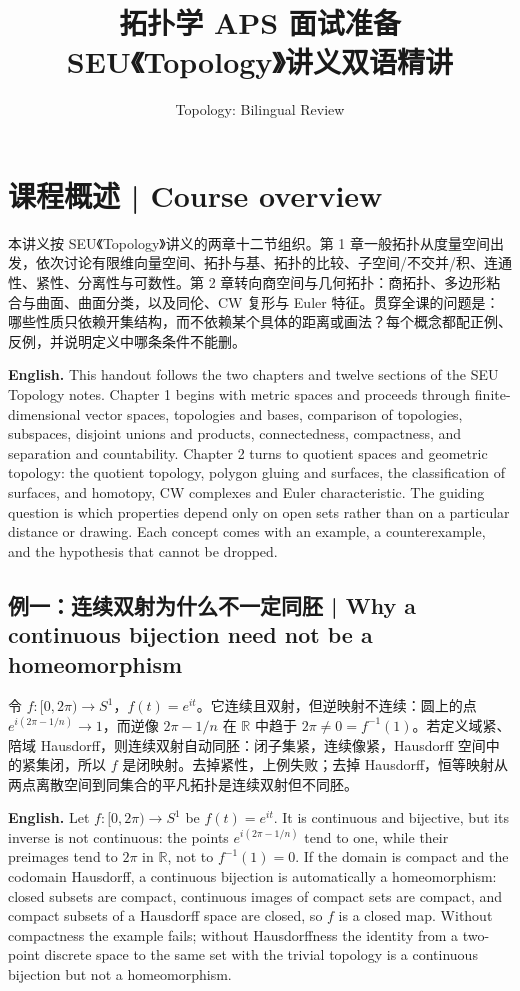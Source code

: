 \documentclass[UTF8,11pt,a4paper]{ctexart}
\title{拓扑学 APS 面试准备\\[4pt]\large SEU《Topology》讲义双语精讲}
\author{Topology: Bilingual Review}
\date{}
\newcommand{\EN}[1]{\par\noindent\textbf{English.} #1\par}
\begin{document}
\maketitle

\section*{课程概述 | Course overview}
\noindent 本讲义按 SEU《Topology》讲义的两章十二节组织。第 1 章一般拓扑从度量空间出发，依次讨论有限维向量空间、拓扑与基、拓扑的比较、子空间/不交并/积、连通性、紧性、分离性与可数性。第 2 章转向商空间与几何拓扑：商拓扑、多边形粘合与曲面、曲面分类，以及同伦、CW 复形与 Euler 特征。贯穿全课的问题是：哪些性质只依赖开集结构，而不依赖某个具体的距离或画法？每个概念都配正例、反例，并说明定义中哪条条件不能删。
\EN{This handout follows the two chapters and twelve sections of the SEU Topology notes. Chapter 1 begins with metric spaces and proceeds through finite-dimensional vector spaces, topologies and bases, comparison of topologies, subspaces, disjoint unions and products, connectedness, compactness, and separation and countability. Chapter 2 turns to quotient spaces and geometric topology: the quotient topology, polygon gluing and surfaces, the classification of surfaces, and homotopy, CW complexes and Euler characteristic. The guiding question is which properties depend only on open sets rather than on a particular distance or drawing. Each concept comes with an example, a counterexample, and the hypothesis that cannot be dropped.}

\subsection*{例一：连续双射为什么不一定同胚 | Why a continuous bijection need not be a homeomorphism}
\noindent 令 $f:[0,2\pi)\to S^1$，$f(t)=e^{it}$。它连续且双射，但逆映射不连续：圆上的点 $e^{i(2\pi-1/n)}\to1$，而逆像 $2\pi-1/n$ 在 $\mathbb R$ 中趋于 $2\pi\ne0=f^{-1}(1)$。若定义域紧、陪域 Hausdorff，则连续双射自动同胚：闭子集紧，连续像紧，Hausdorff 空间中的紧集闭，所以 $f$ 是闭映射。去掉紧性，上例失败；去掉 Hausdorff，恒等映射从两点离散空间到同集合的平凡拓扑是连续双射但不同胚。
\EN{Let $f:[0,2\pi)\to S^1$ be $f(t)=e^{it}$. It is continuous and bijective, but its inverse is not continuous: the points $e^{i(2\pi-1/n)}$ tend to one, while their preimages tend to $2\pi$ in $\mathbb R$, not to $f^{-1}(1)=0$. If the domain is compact and the codomain Hausdorff, a continuous bijection is automatically a homeomorphism: closed subsets are compact, continuous images of compact sets are compact, and compact subsets of a Hausdorff space are closed, so $f$ is a closed map. Without compactness the example fails; without Hausdorffness the identity from a two-point discrete space to the same set with the trivial topology is a continuous bijection but not a homeomorphism.}
\end{document}
